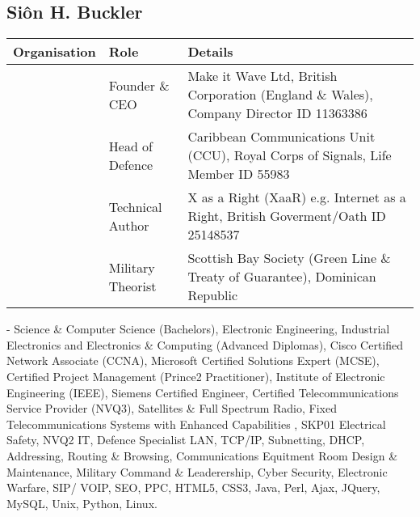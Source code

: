 \documentclass[letterpaper,10pt,openany,oneside,english]{sphinxmanual}
\begin{document}
\subsection{Siôn H. Buckler}
\label{\detokenize{index:sion-h-buckler}}

\begin{savenotes}\sphinxattablestart
\centering
\begin{tabulary}{\linewidth}[t]{|T|T|T|}
\hline
\sphinxstyletheadfamily 
Organisation
&\sphinxstyletheadfamily 
Role
&\sphinxstyletheadfamily 
Details
\\
\hline
\noindent{}
&
Founder \& CEO
&
Make it Wave Ltd, British Corporation (England \& Wales), Company Director ID 11363386
\\
\hline
\noindent{}
&
Head of Defence
&
Caribbean Communications Unit (CCU), Royal Corps of Signals, Life Member ID 55983
\\
\hline
\noindent{}
&
Technical Author
&
X as a Right (XaaR) e.g. Internet as a Right, British Goverment/Oath ID 25148537
\\
\hline
\noindent{}
&
Military Theorist
&
Scottish Bay Society (Green Line \& Treaty of Guarantee), Dominican Republic
\\
\hline
\end{tabulary}
\par
\sphinxattableend\end{savenotes}

 - Science \& Computer Science (Bachelors), Electronic Engineering, Industrial Electronics and Electronics \& Computing (Advanced Diplomas), Cisco Certified Network Associate (CCNA), Microsoft Certified Solutions Expert (MCSE), Certified Project Management (Prince2 Practitioner), Institute of Electronic Engineering (IEEE), Siemens Certified Engineer, Certified Telecommunications Service Provider (NVQ3), Satellites \& Full Spectrum Radio, Fixed Telecommunications Systems with Enhanced Capabilities , SKP01 Electrical Safety, NVQ2 IT, Defence Specialist LAN, TCP/IP, Subnetting, DHCP, Addressing, Routing \& Browsing, Communications Equitment Room Design \& Maintenance, Military Command \& Leaderership,  Cyber Security, Electronic Warfare, SIP/ VOIP, SEO, PPC, HTML5, CSS3, Java, Perl, Ajax, JQuery, MySQL, Unix, Python, Linux.



\renewcommand{\indexname}{Index}
\printindex
\end{document}
